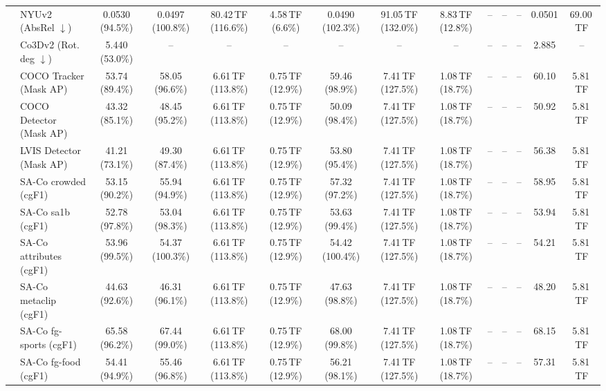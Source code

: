 \begin{table}[t]
\begin{center}
\begin{small}
\begin{sc}
{\begin{tabular}{llcccccccccccc}
& NYUv2 (AbsRel $\downarrow$) & 0.0530 (94.5\%) & 0.0497 (100.8\%) & 80.42\,TF (116.6\%) & 4.58\,TF (6.6\%) & 0.0490 (102.3\%) & 91.05\,TF (132.0\%) & 8.83\,TF (12.8\%) & -- & -- & -- & 0.0501 & 69.00\,TF \\
& Co3Dv2 (Rot. deg $\downarrow$) & 5.440 (53.0\%) & -- & -- & -- & -- & -- & -- & -- & -- & -- & 2.885 & -- \\
\midrule
{}
& COCO Tracker (Mask AP) & 53.74 (89.4\%) & 58.05 (96.6\%) & 6.61\,TF (113.8\%) & 0.75\,TF (12.9\%) & 59.46 (98.9\%) & 7.41\,TF (127.5\%) & 1.08\,TF (18.7\%) & -- & -- & -- & 60.10 & 5.81\,TF \\
& COCO Detector (Mask AP) & 43.32 (85.1\%) & 48.45 (95.2\%) & 6.61\,TF (113.8\%) & 0.75\,TF (12.9\%) & 50.09 (98.4\%) & 7.41\,TF (127.5\%) & 1.08\,TF (18.7\%) & -- & -- & -- & 50.92 & 5.81\,TF \\
& LVIS Detector (Mask AP) & 41.21 (73.1\%) & 49.30 (87.4\%) & 6.61\,TF (113.8\%) & 0.75\,TF (12.9\%) & 53.80 (95.4\%) & 7.41\,TF (127.5\%) & 1.08\,TF (18.7\%) & -- & -- & -- & 56.38 & 5.81\,TF \\
& SA-Co crowded (cgF1) & 53.15 (90.2\%) & 55.94 (94.9\%) & 6.61\,TF (113.8\%) & 0.75\,TF (12.9\%) & 57.32 (97.2\%) & 7.41\,TF (127.5\%) & 1.08\,TF (18.7\%) & -- & -- & -- & 58.95 & 5.81\,TF \\
& SA-Co sa1b (cgF1) & 52.78 (97.8\%) & 53.04 (98.3\%) & 6.61\,TF (113.8\%) & 0.75\,TF (12.9\%) & 53.63 (99.4\%) & 7.41\,TF (127.5\%) & 1.08\,TF (18.7\%) & -- & -- & -- & 53.94 & 5.81\,TF \\
& SA-Co attributes (cgF1) & 53.96 (99.5\%) & 54.37 (100.3\%) & 6.61\,TF (113.8\%) & 0.75\,TF (12.9\%) & 54.42 (100.4\%) & 7.41\,TF (127.5\%) & 1.08\,TF (18.7\%) & -- & -- & -- & 54.21 & 5.81\,TF \\
& SA-Co metaclip (cgF1) & 44.63 (92.6\%) & 46.31 (96.1\%) & 6.61\,TF (113.8\%) & 0.75\,TF (12.9\%) & 47.63 (98.8\%) & 7.41\,TF (127.5\%) & 1.08\,TF (18.7\%) & -- & -- & -- & 48.20 & 5.81\,TF \\
& SA-Co fg-sports (cgF1) & 65.58 (96.2\%) & 67.44 (99.0\%) & 6.61\,TF (113.8\%) & 0.75\,TF (12.9\%) & 68.00 (99.8\%) & 7.41\,TF (127.5\%) & 1.08\,TF (18.7\%) & -- & -- & -- & 68.15 & 5.81\,TF \\
& SA-Co fg-food (cgF1) & 54.41 (94.9\%) & 55.46 (96.8\%) & 6.61\,TF (113.8\%) & 0.75\,TF (12.9\%) & 56.21 (98.1\%) & 7.41\,TF (127.5\%) & 1.08\,TF (18.7\%) & -- & -- & -- & 57.31 & 5.81\,TF \\

\end{tabular}}
\end{sc}
\end{small}
\end{center}
\end{table}
